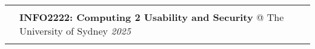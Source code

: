 \documentclass[letterpaper, 8pt]{article}
\newcommand{\tagSecurity}{\corebox{blue}{10}{Security}\xspace}
\newcommand{\tagPrivacy}{\corebox{green}{10}{Privacy}\xspace}
\newcommand{\tagML}{\corebox{yellow}{20}{Machine Learning}\xspace}
\newcommand{\tagSA}{\corebox{brown}{20}{System Analysis}\xspace}
\begin{document}
\begin{longtable}{p{0.5in}p{5.5in}}
& \\



{\color{OliveGreen}{Teaching}} 
& \textbf{INFO2222: Computing 2 Usability and Security} @ The University of Sydney \hfill \textit{2025} \\
\\



\end{longtable}
\end{document}
